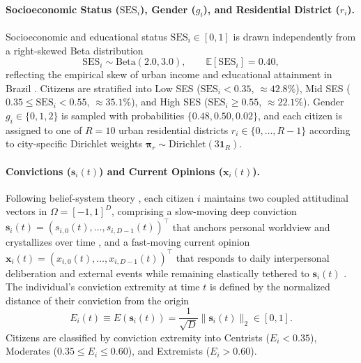 \documentclass{article}
\begin{document}
\paragraph{Socioeconomic Status ($\mathrm{SES}_i$), Gender ($g_i$), and Residential District ($r_i$).}
Socioeconomic and educational status $\mathrm{SES}_i \in [0, 1]$ is drawn independently from a right-skewed Beta distribution
\begin{equation}
    \mathrm{SES}_i \sim \mathrm{Beta}(2.0, 3.0), \qquad \mathbb{E}[\mathrm{SES}_i] = 0.40,
    \label{eq:ses_distribution}
\end{equation}
reflecting the empirical skew of urban income and educational attainment in Brazil \citep{ibge2022censo}. Citizens are stratified into Low SES ($\mathrm{SES}_i < 0.35$, $\approx 42.8\%$), Mid SES ($0.35 \le \mathrm{SES}_i < 0.55$, $\approx 35.1\%$), and High SES ($\mathrm{SES}_i \ge 0.55$, $\approx 22.1\%$). Gender $g_i \in \{0, 1, 2\}$ is sampled with probabilities $\{0.48, 0.50, 0.02\}$, and each citizen is assigned to one of $R = 10$ urban residential districts $r_i \in \{0, \dots, R-1\}$ according to city-specific Dirichlet weights $\mathbf{\pi}_r \sim \mathrm{Dirichlet}(3\mathbf{1}_R)$.

\paragraph{Convictions ($\mathbf{s}_i(t)$) and Current Opinions ($\mathbf{x}_i(t)$).}
Following belief-system theory \citep{converse1964nature, zaller1992nature, kiley2020measuring}, each citizen $i$ maintains two coupled attitudinal vectors in $\Omega = [-1, 1]^D$, comprising a slow-moving deep conviction $\mathbf{s}_i(t) = (s_{i,0}(t), \dots, s_{i,D-1}(t))^\top$ that anchors personal worldview and crystallizes over time \citep{friedkin1990social, alwin1991aging}, and a fast-moving current opinion $\mathbf{x}_i(t) = (x_{i,0}(t), \dots, x_{i,D-1}(t))^\top$ that responds to daily interpersonal deliberation and external events while remaining elastically tethered to $\mathbf{s}_i(t)$ \citep{zaller1992nature}. The individual's conviction extremity at time $t$ is defined by the normalized distance of their conviction from the origin \citep{howe2017attitude}
\begin{equation}
    E_i(t) \equiv E(\mathbf{s}_i(t)) = \frac{1}{\sqrt{D}} \|\mathbf{s}_i(t)\|_2 \in [0, 1].
    \label{eq:conviction_extremity}
\end{equation}
Citizens are classified by conviction extremity into Centrists ($E_i < 0.35$), Moderates ($0.35 \le E_i \le 0.60$), and Extremists ($E_i > 0.60$).
\end{document}
